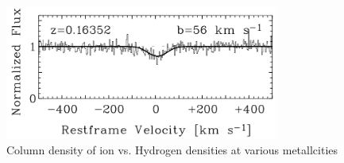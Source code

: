 \documentclass[aspectratio=169,draft]{beamer}
\begin{document}
\begin{frame}{\huge{{\textbf{}}}}

\begin{figure}[!htbp]
  \centering
  \includegraphics[width=9cm]{Figures/BLA-individual.png}
  \vspace*{-1mm}
  \caption{Column density of ion vs. Hydrogen densities at various metallcities }
\end{figure}

\end{frame}
\end{document}
